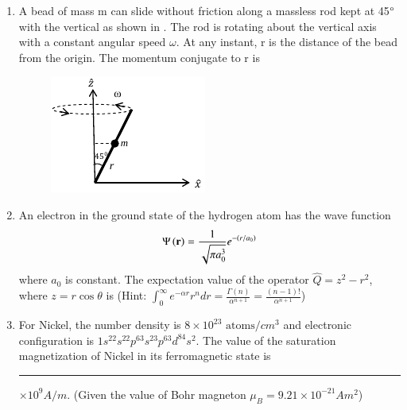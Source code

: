 \documentclass[journal,12pt,onecolumn]{IEEEtran}
\theoremstyle{remark}
\begin{document}
\begin{enumerate}
\item A bead of mass m can slide without friction along a massless rod kept at 45$\degree$ with the vertical as shown in . The rod is rotating about the vertical axis with a constant angular speed $\omega$. At any instant, r is the distance of the bead from the origin. The momentum conjugate to r is
\begin{figure}[H]
\centering
 \caption{} \label{36} \includegraphics[width=0.3\columnwidth]{figs/q36.png}
\end{figure}
\hfill{} \begin{enumerate}  \end{enumerate}

\item An electron in the ground state of the hydrogen atom has the wave function $$\Psi\left(\mathbf{r}\right) = \frac{1}{\sqrt{\pi a_0^3}} e^{-\left(r/a_0\right)}$$ where $a_0$ is constant. The expectation value of the operator $\hat{Q} = z^2 - r^2$, where $z = r\cos\theta$ is (Hint: $\int_0^\infty e^{-\alpha r} r^n dr = \frac{\Gamma(n)}{\alpha^{n+1}} = \frac{(n-1)!}{\alpha^{n+1}}$)
\hfill{} \begin{enumerate}  \end{enumerate}

\item For Nickel, the number density is $8 \times 10^{23} \text{ atoms}/cm^3$ and electronic configuration is $1s^22s^22p^63s^23p^63d^84s^2$. The value of the saturation magnetization of Nickel in its ferromagnetic state is \rule{3cm}{0.4pt} $\times 10^9 A/m$. (Given the value of Bohr magneton $\mu_B = 9.21 \times 10^{-21} Am^2$)\hfill{}


\end{enumerate}
\end{document}
